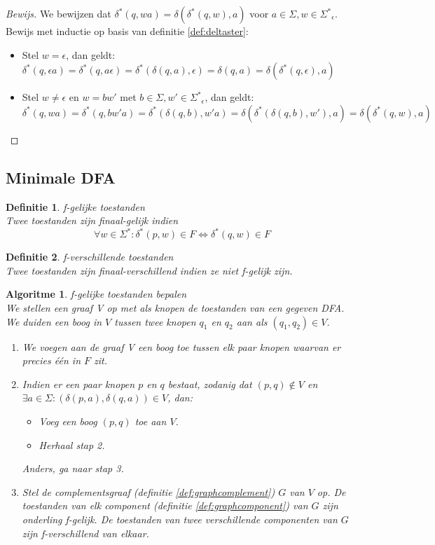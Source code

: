\documentclass[a4paper]{article}
\newtheorem{tdefinitie}{Definitie}[section]
\newenvironment{definitie}[1]%
  {\begin{mdframed}[backgroundcolor=silver,
    topline=false,
    rightline=false,
    leftline=false,
    bottomline=false]\begin{tdefinitie}#1\\\normalfont}%
  {\end{tdefinitie}\end{mdframed}}
\newtheorem{talgo}{Algoritme}[section]
\newenvironment{algoritme}[1]%
  {\begin{mdframed}[backgroundcolor=silver,
    topline=false,
    rightline=false,
    leftline=false,
    bottomline=false]\begin{talgo}#1\\\normalfont}%
  {\end{talgo}\end{mdframed}}
\newenvironment{bewijs}[1]%
  {\begin{mdframed}[topline=true,
    rightline=true,
    leftline=true,
    bottomline=true]\begin{proof}[Bewijs]#1\\[.2cm]\normalfont}%
  {\end{proof}\end{mdframed}}
\newenvironment{enumalgo}%
  {\begin{enumerate}[leftmargin=1.5cm,label=Stap \arabic*:]}%
  {\end{enumerate}}
\newcommand{\sstar}{\ensuremath{\Sigma^*}}
\begin{document}
\begin{bewijs}{We bewijzen dat $\delta^*(q, wa) = \delta(\delta^*(q, w), a)$ voor $a \in \Sigma, w \in \sstar_\epsilon$.}
  Bewijs met inductie op basis van definitie \ref{def:deltaster}:
  \begin{itemize}
  \item Stel $w = \epsilon$, dan geldt:\\$\delta^*(q, \epsilon a) = \delta^*(q, a \epsilon) = \delta^*(\delta(q, a), \epsilon) = \delta(q, a) = \delta(\delta^*(q, \epsilon), a)$
  \item Stel $w \neq \epsilon$ en $w = bw'$ met $b \in \Sigma, w' \in \sstar_\epsilon$, dan geldt:\\$\delta^*(q, wa) = \delta^*(q, bw'a) = \delta^*(\delta(q, b), w'a) = \delta(\delta^*(\delta(q, b), w'), a) = \delta(\delta^*(q, w), a)$
  \end{itemize}
\end{bewijs}

\subsection{Minimale DFA}

\begin{definitie}{f-gelijke toestanden}
  Twee toestanden zijn finaal-gelijk indien
  \vspace{-3mm}\begin{equation*}
  \forall w \in \sstar : \delta^*(p, w) \in F \Leftrightarrow \delta^*(q, w) \in F
  \end{equation*}
\end{definitie}

\begin{definitie}{f-verschillende toestanden}
  Twee toestanden zijn finaal-verschillend indien ze niet f-gelijk zijn.
\end{definitie}

\begin{algoritme}{f-gelijke toestanden bepalen}
  \label{alg:dfafeq}
  We stellen een graaf V op met als knopen de toestanden van een gegeven DFA. We duiden een boog in $V$ tussen twee knopen $q_1$ en $q_2$ aan als $(q_1,q_2) \in V$.
  \begin{enumalgo}
  \item We voegen aan de graaf V een boog toe tussen elk paar knopen waarvan er precies \'e\'en in $F$ zit.
  \item Indien er een paar knopen $p$ en $q$ bestaat, zodanig dat $(p,q) \notin V$ en $\exists a \in \Sigma: (\delta(p, a),\delta(q, a)) \in V$, dan:
  \begin{itemize}
  \item Voeg een boog $(p,q)$ toe aan $V$.
  \item Herhaal stap 2.
  \end{itemize}
  Anders, ga naar stap 3.
  \item Stel de complementsgraaf (definitie \ref{def:graphcomplement}) $G$ van $V$ op. De toestanden van elk component (definitie \ref{def:graphcomponent}) van $G$ zijn onderling f-gelijk. De toestanden van twee verschillende componenten van $G$ zijn f-verschillend van elkaar.
  \end{enumalgo}
\end{algoritme}
\end{document}
